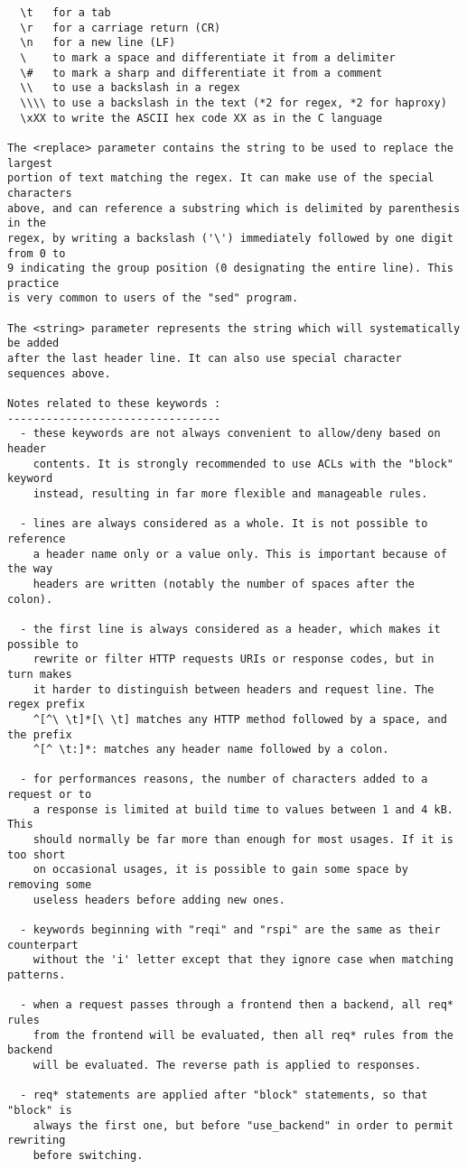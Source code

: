 \begin{verbatim}
  \t   for a tab
  \r   for a carriage return (CR)
  \n   for a new line (LF)
  \    to mark a space and differentiate it from a delimiter
  \#   to mark a sharp and differentiate it from a comment
  \\   to use a backslash in a regex
  \\\\ to use a backslash in the text (*2 for regex, *2 for haproxy)
  \xXX to write the ASCII hex code XX as in the C language

The <replace> parameter contains the string to be used to replace the largest
portion of text matching the regex. It can make use of the special characters
above, and can reference a substring which is delimited by parenthesis in the
regex, by writing a backslash ('\') immediately followed by one digit from 0 to
9 indicating the group position (0 designating the entire line). This practice
is very common to users of the "sed" program.

The <string> parameter represents the string which will systematically be added
after the last header line. It can also use special character sequences above.

Notes related to these keywords :
---------------------------------
  - these keywords are not always convenient to allow/deny based on header
    contents. It is strongly recommended to use ACLs with the "block" keyword
    instead, resulting in far more flexible and manageable rules.

  - lines are always considered as a whole. It is not possible to reference
    a header name only or a value only. This is important because of the way
    headers are written (notably the number of spaces after the colon).

  - the first line is always considered as a header, which makes it possible to
    rewrite or filter HTTP requests URIs or response codes, but in turn makes
    it harder to distinguish between headers and request line. The regex prefix
    ^[^\ \t]*[\ \t] matches any HTTP method followed by a space, and the prefix
    ^[^ \t:]*: matches any header name followed by a colon.

  - for performances reasons, the number of characters added to a request or to
    a response is limited at build time to values between 1 and 4 kB. This
    should normally be far more than enough for most usages. If it is too short
    on occasional usages, it is possible to gain some space by removing some
    useless headers before adding new ones.

  - keywords beginning with "reqi" and "rspi" are the same as their counterpart
    without the 'i' letter except that they ignore case when matching patterns.

  - when a request passes through a frontend then a backend, all req* rules
    from the frontend will be evaluated, then all req* rules from the backend
    will be evaluated. The reverse path is applied to responses.

  - req* statements are applied after "block" statements, so that "block" is
    always the first one, but before "use_backend" in order to permit rewriting
    before switching.


\end{verbatim}

